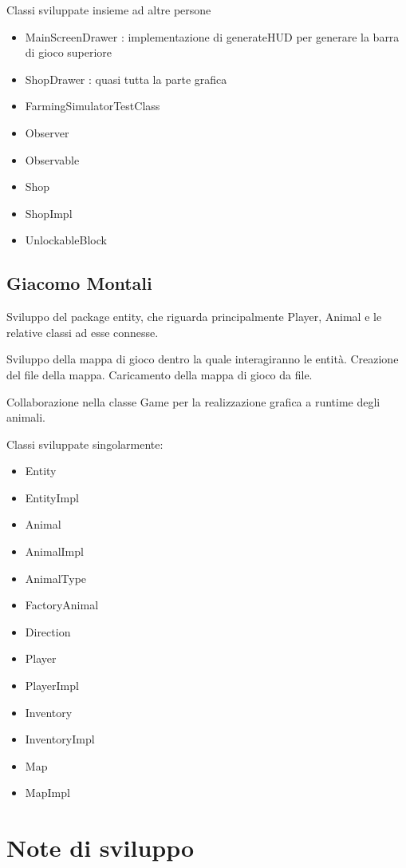 \documentclass[a4paper,12pt]{report}
\begin{document}
Classi sviluppate insieme ad altre persone
{
\begin{itemize}
	\item MainScreenDrawer : implementazione di generateHUD per generare la barra di gioco superiore
	\item ShopDrawer : quasi tutta la parte grafica
	\item FarmingSimulatorTestClass 
	\item Observer
	\item Observable
	\item Shop
	\item ShopImpl
	\item UnlockableBlock
\end{itemize}
}

\subsection{Giacomo Montali}
Sviluppo del package entity, che riguarda principalmente Player, Animal e le relative classi ad esse connesse.

Sviluppo della mappa di gioco dentro la quale interagiranno le entità. Creazione del file della mappa. Caricamento della mappa di gioco da file. 

Collaborazione nella classe Game per la realizzazione grafica a runtime degli animali.

Classi sviluppate singolarmente:
{
\begin{itemize}
	\item Entity
	\item EntityImpl
	\item Animal
	\item AnimalImpl
	\item AnimalType
	\item FactoryAnimal
	\item Direction
	\item Player
	\item PlayerImpl
	\item Inventory
	\item InventoryImpl
	\item Map
	\item MapImpl
\end{itemize}
}


\section{Note di sviluppo}
\end{document}
